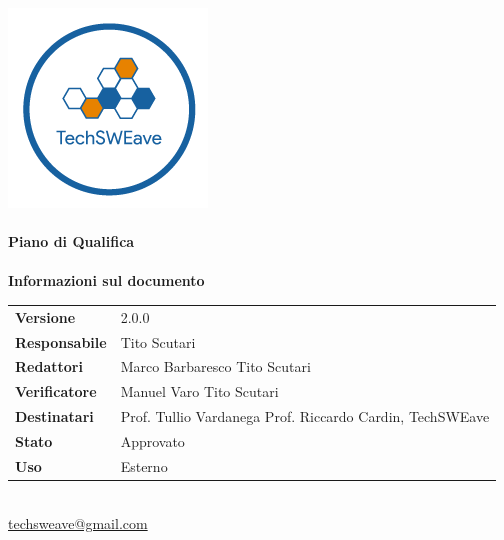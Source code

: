 \documentclass[a4paper]{article}
\begin{document}
\begin{titlepage}
    \begin{center}
        \includegraphics{../../../Images/logo}\\
        \vspace{20px}
        \textcolor{logo}{\hrulefill}\\
        \vspace{20px}
        \textbf{\huge\textcolor{logo}{Piano di Qualifica}}\\
        \vspace{10px}
        \textcolor{logo}{\hrulefill}\\
        \vspace{40px}
        \textbf{\Large Informazioni sul documento}\\
        \vspace{20px}
        \begin{tabular}{p{100px} | p{100px}}
            \textbf{Versione}     & 2.0.0                                                                      \\
            \textbf{Responsabile} & Tito Scutari                                                          \\
            \textbf{Redattori}    & Marco Barbaresco \newline Tito Scutari                                     \\
            \textbf{Verificatore} & Manuel Varo \newline Tito Scutari                                          \\
            \textbf{Destinatari}  & Prof. Tullio Vardanega \newline Prof. Riccardo Cardin, \newline TechSWEave \\
            \textbf{Stato}        & Approvato                                                                  \\
            \textbf{Uso}          & Esterno                                                                    \\
        \end{tabular}\\
        \vspace{60px}
        \href{mailto:techsweave@gmail.com}{techsweave@gmail.com}\\

    \end{center}
\end{titlepage}
\end{document}
